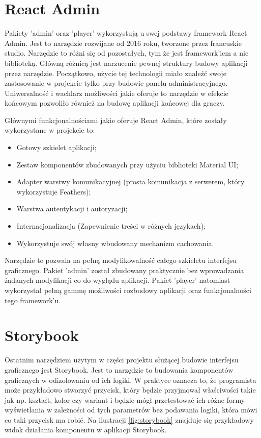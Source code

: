 \section{React Admin}
Pakiety 'admin' oraz 'player' wykorzystują u swej podstawy framework React Admin. Jest to narzędzie rozwijane od 2016 roku, tworzone przez francuskie studio. Narzędzie to różni się od pozostałych, tym że jest framework'iem a nie biblioteką. Główną różnicą jest narzucenie pewnej struktury budowy aplikacji przez narzędzie. Początkowo, użycie tej technologii miało znaleźć swoje zastosowanie w projekcie tylko przy budowie panelu administracyjnego. Uniwersalność i wachlarz możliwości jakie oferuje to narzędzie w efekcie końcowym pozwoliło również na budowę aplikacji końcowej dla graczy.

Głównymi funkcjonalnościami jakie oferuje React Admin, które zostały wykorzystane w projekcie to:

\begin{itemize}
    \item Gotowy szkielet aplikacji;
    \item Zestaw komponentów zbudowanych przy użyciu biblioteki Material UI;
    \item Adapter warstwy komunikacyjnej (prosta komunikacja z serwerem, który wykorzystuje Feathers);
    \item Warstwa autentykacji i autoryzacji;
    \item Internacjonalizacja (Zapewnienie treści w różnych językach);
    \item Wykorzystuje swój własny wbudowany mechanizm cachowania.
\end{itemize}

Narzędzie te pozwala na pełną modyfikowalność całego szkieletu interfejsu graficznego. Pakiet 'admin' został zbudowany praktycznie bez wprowadzania żądanych modyfikacji co do wyglądu aplikacji. Pakiet 'player' natomiast wykorzystał pełną gammę możliwości rozbudowy aplikacji oraz funkcjonalności tego framework'u.

\section{Storybook}
Ostatnim narzędziem użytym w części projektu służącej budowie interfejsu graficznego jest Storybook. Jest to narzędzie to budowania komponentów graficznych w odizolowaniu od ich logiki. W praktyce oznacza to, że programista może przykładowo stworzyć przycisk, który będzie przyjmował właściwości takie jak np. kształt, kolor czy wariant i będzie mógł przetestować ich różne formy wyświetlania w zależności od tych parametrów bez podawania logiki, która mówi co taki przycisk ma robić. Na ilustracji \ref{fig:storybook} znajduje się przykładowy widok działania komponentu w aplikacji Storybook.

